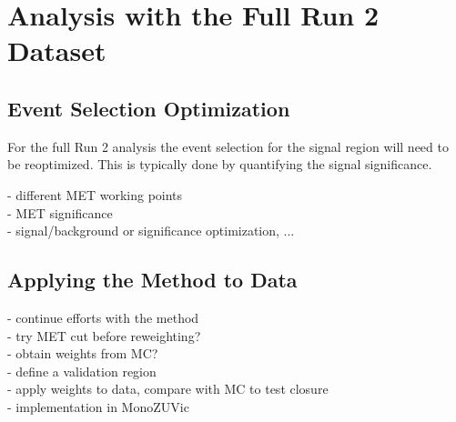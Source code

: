 \chapter{Analysis with the Full Run 2 Dataset}
\label{chapter:fullRun2}

\section{Event Selection Optimization}

For the full Run 2 analysis the event selection for the signal region will need to be reoptimized. This is typically done by quantifying the signal significance. 

- different MET working points\\

- MET significance \\ 

- signal/background or significance optimization, ...\\

\section{Applying the \gjets Method to Data}

- continue efforts with the \gjets method\\
- try MET cut before reweighting?\\
- obtain weights from MC?\\
- define a validation region\\
- apply weights to data, compare with MC to test closure\\
- implementation in MonoZUVic\\

